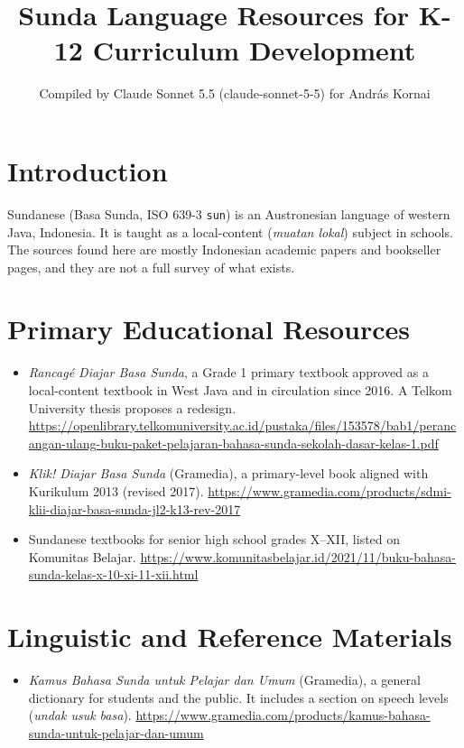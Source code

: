 \documentclass[12pt]{article}
\title{Sunda Language Resources for K-12 Curriculum Development}
\author{Compiled by Claude Sonnet 5.5 (claude-sonnet-5-5) for Andr\'as Kornai}
\date{}
\begin{document}
\maketitle

\section{Introduction}
Sundanese (Basa Sunda, ISO 639-3 \texttt{sun}) is an Austronesian language of western Java, Indonesia. It is taught as a local-content (\emph{muatan lokal}) subject in schools. The sources found here are mostly Indonesian academic papers and bookseller pages, and they are not a full survey of what exists.

\section{Primary Educational Resources}
\begin{itemize}
\item \emph{Rancag\'e Diajar Basa Sunda}, a Grade 1 primary textbook approved as a local-content textbook in West Java and in circulation since 2016. A Telkom University thesis proposes a redesign. \url{https://openlibrary.telkomuniversity.ac.id/pustaka/files/153578/bab1/perancangan-ulang-buku-paket-pelajaran-bahasa-sunda-sekolah-dasar-kelas-1.pdf}
\item \emph{Klik! Diajar Basa Sunda} (Gramedia), a primary-level book aligned with Kurikulum 2013 (revised 2017). \url{https://www.gramedia.com/products/sdmi-klii-diajar-basa-sunda-jl2-k13-rev-2017}
\item Sundanese textbooks for senior high school grades X--XII, listed on Komunitas Belajar. \url{https://www.komunitasbelajar.id/2021/11/buku-bahasa-sunda-kelas-x-10-xi-11-xii.html}
\end{itemize}

\section{Linguistic and Reference Materials}
\begin{itemize}
\item \emph{Kamus Bahasa Sunda untuk Pelajar dan Umum} (Gramedia), a general dictionary for students and the public. It includes a section on speech levels (\emph{undak usuk basa}). \url{https://www.gramedia.com/products/kamus-bahasa-sunda-untuk-pelajar-dan-umum}
\end{itemize}
\end{document}
